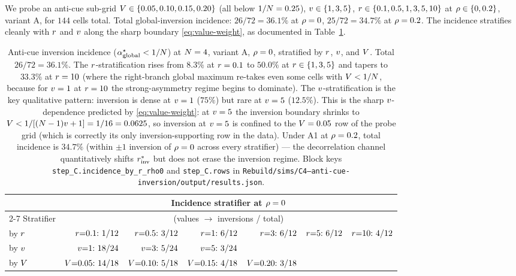 We probe an anti-cue sub-grid $V \in \{0.05, 0.10, 0.15,
0.20\}$ (all below $1/N = 0.25$), $v \in \{1, 3, 5\}$,
$r \in \{0.1, 0.5, 1, 3, 5, 10\}$ at $\rho \in \{0, 0.2\}$,
variant A, for $144$ cells total. Total global-inversion incidence:
$26 / 72 = 36.1\%$ at $\rho = 0$, $25 / 72 = 34.7\%$ at
$\rho = 0.2$. The incidence stratifies cleanly with $r$ and
$v$ along the sharp boundary \eqref{eq:value-weight}, as
documented in Table~\ref{tab:c4-anticue}.
%
\begin{table}[t]
  \centering
  \small
  \begin{tabular}{l r r r r r r}
    \toprule
    & \multicolumn{6}{c}{Incidence stratifier at $\rho = 0$} \\
    \cmidrule(lr){2-7}
    Stratifier & \multicolumn{6}{c}{(values $\to$ inversions / total)} \\
    \midrule
    by $r$ &
    $r{=}0.1{:}\ 1/12$ &
    $r{=}0.5{:}\ 3/12$ &
    $\Rsens{=}1{:}\ 6/12$ &
    $\Rsens{=}3{:}\ 6/12$ &
    $\Rsens{=}5{:}\ 6/12$ &
    $r{=}10{:}\ 4/12$ \\
    by $v$ &
    $\val{=}1{:}\ 18/24$ &
    $\val{=}3{:}\ 5/24$ &
    $\val{=}5{:}\ 3/24$ &
     & & \\
    by $V$ &
    $V{=}0.05{:}\ 14/18$ &
    $V{=}0.10{:}\ 5/18$ &
    $V{=}0.15{:}\ 4/18$ &
    $V{=}0.20{:}\ 3/18$ &
    & \\
    \bottomrule
  \end{tabular}
  \caption{Anti-cue inversion incidence ($\alpha^\star_{\mathrm{global}}
  < 1/N$) at $N = 4$, variant A, $\rho = 0$, stratified by
  $r$, $v$, and $V$. Total $26/72 = 36.1\%$. The
  $r$-stratification rises from $8.3\%$ at $r = 0.1$ to
  $50.0\%$ at $r \in \{1, 3, 5\}$ and tapers to $33.3\%$ at
  $r = 10$ (where the right-branch global maximum re-takes
  even some cells with $V < 1/N$, because for $v = 1$ at
  $r = 10$ the strong-asymmetry regime begins to dominate).
  The $v$-stratification is the key qualitative pattern:
  inversion is dense at $v = 1$ ($75\%$) but rare at $v = 5$
  ($12.5\%$). This is the sharp $v$-dependence predicted by
  \eqref{eq:value-weight}: at $v = 5$ the inversion boundary
  shrinks to $V < 1/[(N-1)v + 1] = 1/16 = 0.0625$, so
  inversion at $v = 5$ is confined to the $V = 0.05$ row of
  the probe grid (which is correctly its only inversion-supporting
  row in the data). Under A1 at $\rho = 0.2$, total incidence is
  $34.7\%$ (within $\pm 1$ inversion of $\rho = 0$ across every
  stratifier) --- the decorrelation channel quantitatively shifts
  $r^{*}_{\mathrm{inv}}$ but does not erase the inversion regime. Block keys
  \texttt{step\_C.incidence\_by\_r\_rho0} and
  \texttt{step\_C.rows} in
  \texttt{Rebuild/sims/C4--anti-cue-inversion/output/results.json}.}
  \label{tab:c4-anticue}
\end{table}


